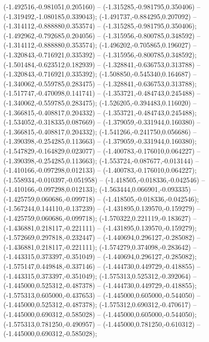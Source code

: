  (-1.492516,-0.981051,0.205160) -- (-1.315285,-0.981795,0.350406) -- (-1.319492,-1.080185,0.339043);
 (-1.491737,-0.884295,0.207092) -- (-1.314112,-0.888880,0.353574) -- (-1.315285,-0.981795,0.350406);
 (-1.492962,-0.792685,0.204056) -- (-1.315956,-0.800785,0.348592) -- (-1.314112,-0.888880,0.353574);
 (-1.496202,-0.705865,0.196027) -- (-1.320843,-0.716921,0.335392) -- (-1.315956,-0.800785,0.348592);
 (-1.501484,-0.623512,0.182939) -- (-1.328841,-0.636753,0.313788) -- (-1.320843,-0.716921,0.335392);
 (-1.508850,-0.545340,0.164687) -- (-1.340062,-0.559785,0.283475) -- (-1.328841,-0.636753,0.313788);
 (-1.517747,-0.470098,0.141741) -- (-1.353721,-0.484743,0.245488) -- (-1.340062,-0.559785,0.283475);
 (-1.526205,-0.394483,0.116020) -- (-1.366815,-0.408817,0.204332) -- (-1.353721,-0.484743,0.245488);
 (-1.534052,-0.318335,0.087669) -- (-1.379059,-0.331944,0.160380) -- (-1.366815,-0.408817,0.204332);
 (-1.541266,-0.241750,0.056686) -- (-1.390398,-0.254285,0.113663) -- (-1.379059,-0.331944,0.160380);
 (-1.547829,-0.164829,0.023077) -- (-1.400783,-0.176010,0.064227) -- (-1.390398,-0.254285,0.113663);
 (-1.553724,-0.087677,-0.013144) -- (-1.410166,-0.097298,0.012133) -- (-1.400783,-0.176010,0.064227);
 (-1.558934,-0.010397,-0.051958) -- (-1.418505,-0.018336,-0.042546) -- (-1.410166,-0.097298,0.012133);
 (-1.563444,0.066901,-0.093335) -- (-1.425759,0.060686,-0.099718) -- (-1.418505,-0.018336,-0.042546);
 (-1.567244,0.144110,-0.137239) -- (-1.431895,0.139570,-0.159279) -- (-1.425759,0.060686,-0.099718);
 (-1.570322,0.221119,-0.183627) -- (-1.436881,0.218117,-0.221111) -- (-1.431895,0.139570,-0.159279);
 (-1.572669,0.297818,-0.232447) -- (-1.440694,0.296127,-0.285082) -- (-1.436881,0.218117,-0.221111);
 (-1.574279,0.374098,-0.283642) -- (-1.443315,0.373397,-0.351049) -- (-1.440694,0.296127,-0.285082);
 (-1.575147,0.449848,-0.337146) -- (-1.444730,0.449729,-0.418855) -- (-1.443315,0.373397,-0.351049);
 (-1.575313,0.525312,-0.392064) -- (-1.445000,0.525312,-0.487378) -- (-1.444730,0.449729,-0.418855);
 (-1.575313,0.605000,-0.437653) -- (-1.445000,0.605000,-0.544050) -- (-1.445000,0.525312,-0.487378);
 (-1.575312,0.690312,-0.470617) -- (-1.445000,0.690312,-0.585028) -- (-1.445000,0.605000,-0.544050);
 (-1.575313,0.781250,-0.490957) -- (-1.445000,0.781250,-0.610312) -- (-1.445000,0.690312,-0.585028);
